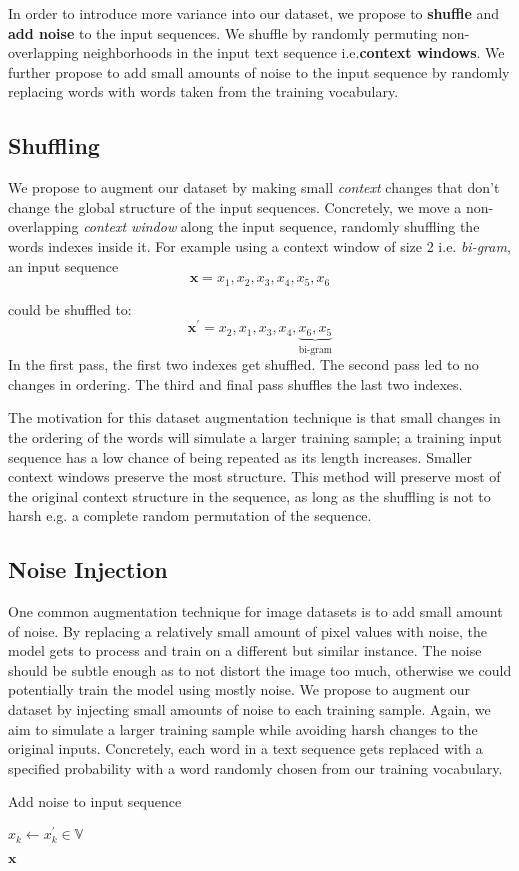 In order to introduce more variance into our dataset, we propose to \textbf{shuffle} and \textbf{add noise} to the input sequences.
We shuffle by randomly permuting non-overlapping neighborhoods in the input text sequence i.e.\textbf{context windows}.
We further propose to add small amounts of
noise to the input sequence by randomly replacing words with words taken from the training vocabulary.

\subsection{Shuffling}
We propose to augment our dataset by making small \textit{context} changes that don't change the global structure
of the input sequences. Concretely, we move a non-overlapping \textit{context window} along the input sequence, randomly
shuffling the words indexes inside it. For example using a context window of size 2 i.e. \textit{bi-gram}, an input sequence
\[\bm{x} = x_1, x_2, x_3, x_4, x_5, x_6\]

 could be shuffled to:
\[\bm{x}^{\prime} = x_2, x_1, x_3, x_4, \underbrace{x_6, x_5}_\text{bi-gram}\]
In the first pass, the first two indexes get shuffled. The second pass led to no changes in ordering. The third and
final pass shuffles the last two indexes.

The motivation for this dataset augmentation technique is that small changes in the ordering of the words will
simulate a larger training sample; a training input sequence has a low chance of being repeated as its
length increases. Smaller context windows preserve the most structure. This method will preserve
most of the original context structure in the sequence, as long as the shuffling is not to harsh e.g.
a complete random permutation of the sequence.

\subsection{Noise Injection}
One common augmentation technique for image datasets is to add small amount of noise. By replacing a relatively small
amount of pixel values with noise, the model gets to process and train on a different but similar instance. The noise should be subtle
enough as to not distort the image too much, otherwise we could potentially train the model using mostly noise.
We propose to augment our dataset by injecting small amounts of noise to each training sample. Again, we aim to simulate
a larger training sample while avoiding harsh changes to the original inputs. Concretely, each word in a text sequence gets replaced
with a specified probability with a word randomly chosen from our training vocabulary.
\begin{algorithm}[H]
\caption{Add noise to input sequence}
\begin{algorithmic}[1]
\State$x_k \gets x^{\prime}_k \in \mathbb{V}$
\EndIf
\EndFor

\Return $\bm{x}$
\EndProcedure
\end{algorithmic}
\end{algorithm}


